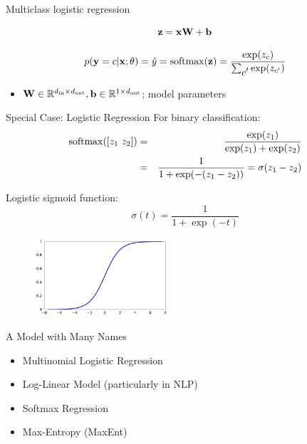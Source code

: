 \documentclass{beamer}
\begin{document}
\begin{frame}{Multiclass logistic regression}
  
  \[ \mathbf{z} = \mathbf{x} \mathbf{W} + \mathbf{b}\] 

    \[ p(\boldy =c | \boldx; \theta) = \hat{y} = \softmax(\boldz) = 
      \frac{\exp(z_c)}{ \sum_{\displaystyle c'} \exp(z_{c'})}   \] 
    \begin{itemize}
    \item $\mathbf{W} \in \mathbb{R}^{{d_{\mathrm{in}}} \times {d_{\mathrm{out}}}}, \mathbf{b} \in \mathbb{R}^{1 \times {d_{\mathrm{out}}}}$; model parameters
    \end{itemize}

\end{frame}

\begin{frame}{Special Case: Logistic Regression}
  For binary classification:
  \begin{eqnarray*}
   \softmax([z_1\ z_2]) &=& \frac{\exp(z_1)}{\exp(z_1) + \exp(z_2)} \\
 &=& \frac{1}{1 + \exp(-(z_1-z_2))} = \sigma(z_1 -z_2)
  \end{eqnarray*}

  Logistic sigmoid function:
  \[\sigma(t) = \frac{1}{1 + \exp(-t)} \]
  \begin{figure}
    \centering
    \includegraphics[width=5cm]{sigmoid}
  \end{figure}
\end{frame}

\begin{frame}{A Model with Many Names}
  \begin{itemize}
  \item  Multinomial Logistic Regression

  \item Log-Linear Model (particularly in NLP)

  \item Softmax Regression

  \item Max-Entropy (MaxEnt)
  \end{itemize}
\end{frame}
\end{document}
